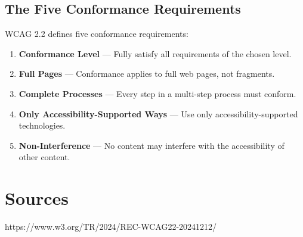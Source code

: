 \documentclass[11pt,a4paper]{article}
\begin{document}
\subsection{The Five Conformance Requirements}
WCAG 2.2 defines five conformance requirements:
\begin{enumerate}
  \item \textbf{Conformance Level} --- Fully satisfy all requirements of the
        chosen level.
  \item \textbf{Full Pages} --- Conformance applies to full web pages, not
        fragments.
  \item \textbf{Complete Processes} --- Every step in a multi-step process must
        conform.
  \item \textbf{Only Accessibility-Supported Ways} --- Use only
        accessibility-supported technologies.
  \item \textbf{Non-Interference} --- No content may interfere with the
        accessibility of other content.
\end{enumerate}

\section{Sources}
https://www.w3.org/TR/2024/REC-WCAG22-20241212/
\end{document}
